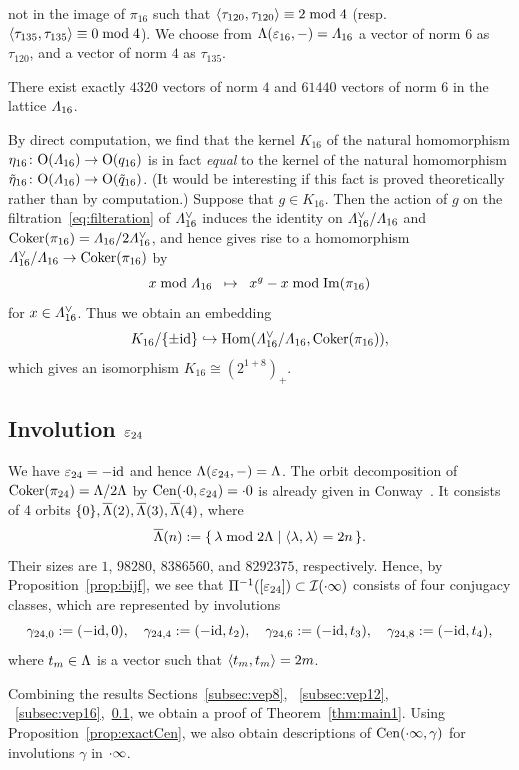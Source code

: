 \documentclass{amsart} %
\begin{document}
not in the image of $\pi_{16}$ 
such  that
$\langle  \tau_{120},  \tau_{120} \rangle\equiv 2 \bmod 4$
 (resp. ~$\langle  \tau_{135},  \tau_{135} \rangle\equiv 0 \bmod 4$).
 We choose from $\Lambda(\varepsilon_{16}, -)=\varLambda_{16}$ a vector of norm $6$ as $\tau_{120}$,
 and a vector of norm $4$ as $\tau_{135}$.
%
\begin{remark}\label{remLam16}
There exist exactly $4320$ vectors of norm $4$ 
and  $61440$ vectors of norm $6$ 
in the lattice $\varLambda_{16}$.
\end{remark}
%
\begin{remark}\label{remK16}
By direct computation, 
we find that 
the kernel $K_{16}$ of the natural homomorphism $\eta_{16}\colon\mathord{\mathrm{O}}(\varLambda_{16})\to \mathord{\mathrm{O}}(q_{16})$
is in fact  \emph{equal} to the kernel of the natural homomorphism 
$\tilde{\eta}_{16}\colon \mathord{\mathrm{O}}(\varLambda_{16})\to \mathord{\mathrm{O}}(\tilde{q}_{16})$.
(It would be interesting if this fact is proved theoretically rather than by computation.)
Suppose that $g\in K_{16}$.
Then 
the action of $g$ on
the filtration~\eqref{eq:filteration} of $\varLambda_{16}^{\vee}$
induces the identity on 
 $\varLambda_{16}^{\vee}/\varLambda_{16}$  and $\operatorname{Coker} (\pi_{16})=\varLambda_{16}/2\varLambda_{16}^{\vee}$, 
and hence gives rise to a homomorphism $\varLambda_{16}^{\vee}/\varLambda_{16}\to \operatorname{Coker} (\pi_{16})$
by 
\[ x \bmod \varLambda_{16} \;\;\mapsto \;\; x^g- x \bmod \operatorname{Im}(\pi_{16})
\]
for $x\in \varLambda_{16}^{\vee}$.
Thus  we obtain an embedding
\[
K_{16}/\{\pm \mathord{\mathrm{id}}\}\hookrightarrow \operatorname{Hom}(\varLambda_{16}^{\vee}/\varLambda_{16}, \operatorname{Coker} (\pi_{16})), 
\]
which gives an isomorphism $K_{16}\cong (2^{1+8})_{+}$.
\end{remark}
%
%
\subsection{Involution $\varepsilon_{24}$}\label{subsec:vep24}
%
We have $\varepsilon_{24}=-\mathord{\mathrm{id}}$ and hence $\Lambda(\varepsilon_{24}, -)=\Lambda$.
The orbit decomposition of 
$\operatorname{Coker}(\pi_{24})=\Lambda/2\Lambda$ by $\mathrm{Cen}(\cdot 0, \varepsilon_{24})=\cdot 0$ is already given in 
Conway~\cite[Chapter 10, Section 3.3]{theCSbook}.
It consists of $4$ orbits $\{0\}, \overline{\Lambda}(2), \overline{\Lambda}(3), \overline{\Lambda}(4)$, where 
\[
 \overline{\Lambda}(n):=\{\,{\lambda\bmod 2\Lambda}\mid {\langle \lambda, \lambda \rangle=2n} \,\}.
\]
Their sizes are  $1$, $98280$,  $8386560$, and $8292375$, respectively.
Hence, by Proposition~\ref{prop:bijf},  we see that 
$\Pi^{-1} ([\varepsilon_{24}])\subset \mathord{\mathcal{I}}(\cdot \infty)$  consists of four conjugacy classes,
 which are 
 represented  by  involutions
 \[
\gamma_{24, 0}:=(-\mathord{\mathrm{id}}, 0),
\quad
\gamma_{24, 4}:=(-\mathord{\mathrm{id}}, t_2),
\quad
\gamma_{24, 6}:=(-\mathord{\mathrm{id}}, t_3),
\quad
\gamma_{24, 8}:=(-\mathord{\mathrm{id}}, t_4),
 \]
where $t_m\in \Lambda$ is a vector such that
$\langle  t_m, t_m \rangle=2m$.
%
\par
\medskip
Combining the results Sections~\ref{subsec:vep8}, ~\ref{subsec:vep12}, ~\ref{subsec:vep16},~\ref{subsec:vep24},
we obtain a proof of Theorem~\ref{thm:main1}.
Using Proposition~\ref{prop:exactCen}, we also obtain descriptions of $\mathrm{Cen}(\cdot \infty, \gamma)$
for involutions $\gamma$ in $\cdot \infty$.
%
%
\end{document}
